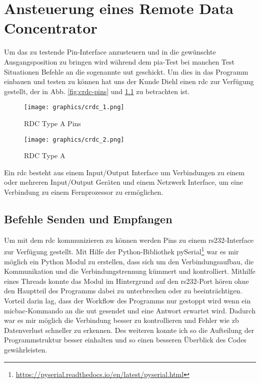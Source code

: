 \chapter{Ansteuerung eines Remote Data Concentrator}
\label{ch:micbac}

Um das zu testende Pin-Interface anzusteuern und in die gewünschte Ausgangsposition zu 
bringen wird während dem \ac{pia}-Test bei manchen Test Situationen Befehle an die 
sogenannte \ac{uut} geschickt. Um dies in das Programm einbauen und testen zu können hat 
uns der Kunde Diehl einen \ac{rdc} zur Verfügung gestellt, der in Abb. 
\ref{fig:crdc-pins} und \ref{fig:crdc_top} zu betrachten ist.

\begin{figure}[H]
	\begin{minipage}{0.5\textwidth}
		\centering
		\texttt{[image: graphics/crdc\_1.png]}
		\caption{RDC Type A Pins}
		\label{fig:crdc-pins}
	\end{minipage}
	\begin{minipage}{0.5\textwidth}
		\centering
		\texttt{[image: graphics/crdc\_2.png]}
		\caption{RDC Type A}
		\label{fig:crdc_top}
	\end{minipage}
\end{figure}

Ein \ac{rdc} besteht aus einem Input/Output Interface um Verbindungen zu einem oder 
mehreren Input/Output Geräten und einem Netzwerk Interface, um eine Verbindung zu einem 
Fernprozessor zu ermöglichen.


\section{Befehle Senden und Empfangen}
\label{sec:com-send-receive}

Um mit dem \ac{rdc} kommunizieren zu können werden Pins zu einem \ac{rs232}-Interface zur Verfügung gestellt. Mit Hilfe der Python-Bibliothek pySerial\footnote{\url{https://pyserial.readthedocs.io/en/latest/pyserial.html}} war es mir möglich ein Python Modul zu erstellen, dass sich um den Verbindungsaufbau, die Kommunikation und die Verbindungstrennung kümmert und kontrolliert. Mithilfe eines Threads konnte das Modul im Hintergrund auf den \ac{rs232}-Port hören ohne den Hauptteil des Programms dabei zu unterbrechen oder zu beeinträchtigen. Vorteil darin lag, dass der Workflow des Programms nur gestoppt wird wenn ein \ac{micbac}-Kommando an die \ac{uut} gesendet und eine Antwort erwartet wird. Dadurch war es mir möglich die Verbindung besser zu kontrollieren und Fehler wie \ac{zb} Datenverlust schneller zu erkennen. Des weiteren konnte ich so die Aufteilung der Programmstruktur besser einhalten und so einen besseren Überblick des Codes gewährleisten.

